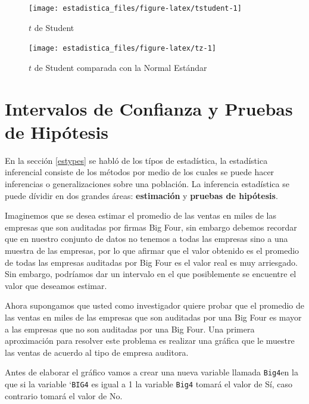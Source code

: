 \documentclass[]{book}
\begin{document}
\begin{figure}[h]

{\centering \texttt{[image: estadistica\_files/figure-latex/tstudent-1]} 

}

\caption{$t$ de Student}\label{fig:tstudent}
\end{figure}

\begin{figure}[h]

{\centering \texttt{[image: estadistica\_files/figure-latex/tz-1]} 

}

\caption{$t$ de Student comparada con la Normal Estándar}\label{fig:tz}
\end{figure}

\hypertarget{icph}{%
\chapter{Intervalos de Confianza y Pruebas de Hipótesis}\label{icph}}

En la sección \ref{estypes} se habló de los típos de estadística, la estadística inferencial consiste de los métodos por medio de los cuales se puede hacer inferencias o generalizaciones sobre una población. La inferencia estadística se puede dívidir en dos grandes áreas: \textbf{estimación} y \textbf{pruebas de hipótesis}.

Imaginemos que se desea estimar el promedio de las ventas en miles de las empresas que son auditadas por firmas Big Four, sin embargo debemos recordar que en nuestro conjunto de datos no tenemos a todas las empresas sino a una muestra de las empresas, por lo que afirmar que el valor obtenido es el promedio de todas las empresas auditadas por Big Four es el valor real es muy arriesgado. Sin embargo, podríamos dar un intervalo en el que posiblemente se encuentre el valor que deseamos estimar.

Ahora supongamos que usted como investigador quiere probar que el promedio de las ventas en miles de las empresas que son auditadas por una Big Four es mayor a las empresas que no son auditadas por una Big Four. Una primera aproximación para resolver este problema es realizar una gráfica que le muestre las ventas de acuerdo al tipo de empresa auditora.

Antes de elaborar el gráfico vamos a crear una nueva variable llamada \texttt{Big4}en la que si la variable `\texttt{BIG4} es igual a 1 la variable \texttt{Big4} tomará el valor de Sí, caso contrario tomará el valor de No.~
\end{document}
